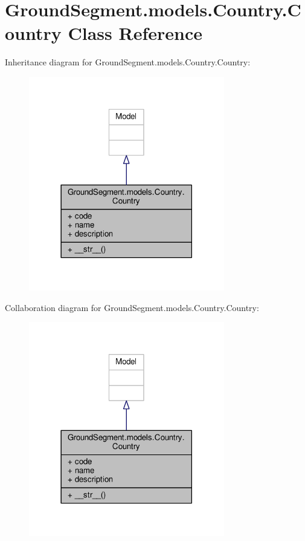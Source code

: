 \hypertarget{class_ground_segment_1_1models_1_1_country_1_1_country}{}\section{Ground\+Segment.\+models.\+Country.\+Country Class Reference}
\label{class_ground_segment_1_1models_1_1_country_1_1_country}


Inheritance diagram for Ground\+Segment.\+models.\+Country.\+Country\+:\nopagebreak
\begin{figure}[H]
\begin{center}
\leavevmode
\includegraphics[width=242pt]{class_ground_segment_1_1models_1_1_country_1_1_country__inherit__graph}
\end{center}
\end{figure}


Collaboration diagram for Ground\+Segment.\+models.\+Country.\+Country\+:\nopagebreak
\begin{figure}[H]
\begin{center}
\leavevmode
\includegraphics[width=242pt]{class_ground_segment_1_1models_1_1_country_1_1_country__coll__graph}
\end{center}
\end{figure}
